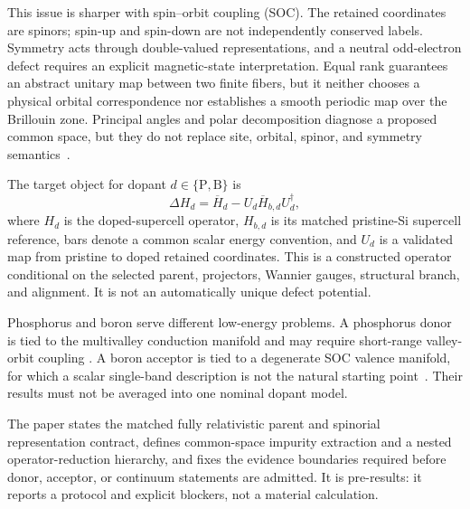 \documentclass[11pt]{article}
\begin{document}
This issue is sharper with spin--orbit coupling (SOC). The retained coordinates are
spinors; spin-up and spin-down are not independently conserved labels. Symmetry acts
through double-valued representations, and a neutral odd-electron defect requires an
explicit magnetic-state interpretation. Equal rank guarantees an abstract unitary map
between two finite fibers, but it neither chooses a physical orbital correspondence nor
establishes a smooth periodic map over the Brillouin zone. Principal angles and polar
decomposition diagnose a proposed common space, but they do not replace site, orbital,
spinor, and symmetry semantics~\cite{bjorck1973,higham1986}.

The target object for dopant $d\in\{\mathrm P,\mathrm B\}$ is
\begin{equation}
 \Delta H_d=\overline H_d-U_d\overline H_{b,d}U_d^\dagger,
 \label{eq:target}
\end{equation}
where $H_d$ is the doped-supercell operator, $H_{b,d}$ is its matched pristine-Si
supercell reference, bars denote a common scalar energy convention, and $U_d$ is a
validated map from pristine to doped retained coordinates. This is a constructed
operator conditional on the selected parent, projectors, Wannier gauges, structural
branch, and alignment. It is not an automatically unique defect potential.

Phosphorus and boron serve different low-energy problems. A phosphorus donor is tied to
the multivalley conduction manifold and may require short-range valley-orbit coupling
\cite{kohn1955,wellard2005}. A boron acceptor is tied to a degenerate SOC valence
manifold, for which a scalar single-band description is not the natural starting
point~\cite{baldereschi1973}. Their results must not be averaged into one nominal dopant
model.

The paper states the matched fully relativistic parent and spinorial representation
contract, defines common-space impurity extraction and a nested operator-reduction
hierarchy, and fixes the evidence boundaries required before donor, acceptor, or
continuum statements are admitted. It is pre-results: it reports a protocol and explicit
blockers, not a material calculation.
\end{document}
